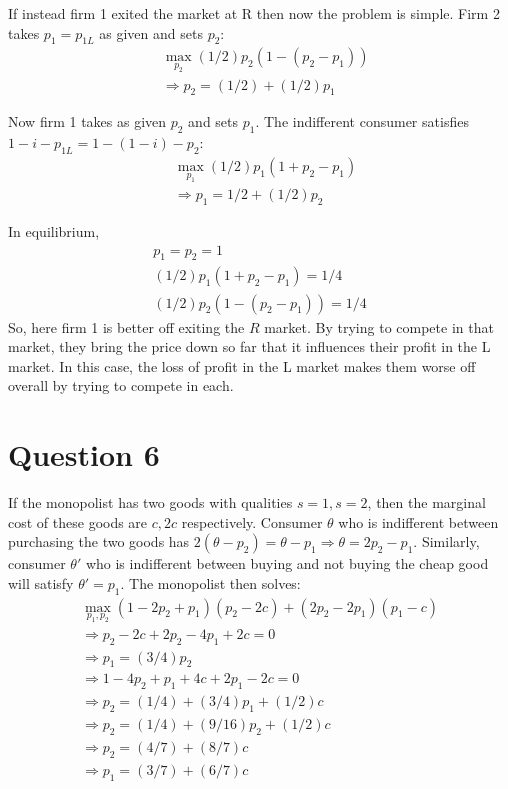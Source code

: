 \documentclass[11pt]{article} %
\begin{document}
If instead firm 1 exited the market at R then now the problem is simple. Firm 2 takes $p_{1} = p_{1L}$ as given and sets $p_2$:
\begin{align*}
&\max_{p_2} (1/2)p_2( 1 - ( p_2 - p_{1})) \\
&\Rightarrow p_2 = (1/2) + (1/2)p_{1}
\end{align*}

Now firm 1 takes as given $p_2$ and sets $p_1$. The indifferent consumer satisfies $1 - i - p_{1L} = 1-(1-i) - p_2$:
\begin{align*}
&\max_{p_{1}} (1/2)p_{1}(1+p_2-p_{1}) \\
&\Rightarrow p_{1} = 1/2 + (1/2)p_2 
\end{align*}

In equilibrium,
\begin{align*}
p_1 = p_2 = 1\\
(1/2)p_{1}(1+p_2-p_{1}) = 1/4\\
 (1/2)p_2( 1 - ( p_2 - p_{1})) = 1/4
\end{align*}
So, here firm 1 is better off exiting the $R$ market. By trying to compete in that market, they bring the price down so far that it influences their profit in the L market. In this case, the loss of profit in the L market makes them worse off overall by trying to compete in each.

\section{Question 6}
If the monopolist has two goods with qualities $s=1,s=2$, then the marginal cost of these goods are $c,2c$ respectively. Consumer $\theta$ who is indifferent between purchasing the two goods has $2(\theta - p_2) = \theta - p_1 \Rightarrow \theta = 2p_2 - p_1.$ Similarly, consumer $\theta'$ who is indifferent between buying and not buying the cheap good will satisfy $\theta' = p_1$. The monopolist then solves:
\begin{align*}
\max_{p_1,p_2} (1 - 2p_2 + p_1)(p_2 - 2c) + (2p_2 -  2p_1)(p_1 - c) \\
\Rightarrow p_2 - 2c + 2p_2 - 4p_1 + 2c = 0\\
\Rightarrow p_1 = (3/4)p_2 \\
\Rightarrow 1 - 4p_2 + p_1 +4c + 2p_1 - 2c = 0 \\
\Rightarrow p_2 = (1/4) + (3/4)p_1 +(1/2)c \\
\Rightarrow p_2 = (1/4) + (9/16)p_2 + (1/2)c \\
\Rightarrow p_2 = (4/7) + (8/7)c \\
\Rightarrow p_1 = (3/7) +(6/7)c
\end{align*}
\end{document}
